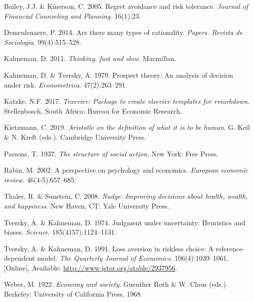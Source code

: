 \documentclass[11pt,preprint, authoryear]{elsarticle}
\numberwithin{equation}{section}
\numberwithin{figure}{section}
\numberwithin{table}{section}
\newlength{\cslhangindent}
\newenvironment{CSLReferences}%
  {\setlength{\parindent}{0pt}%
  \everypar{\setlength{\hangindent}{\cslhangindent}}\ignorespaces}%
  {\par}
\begin{document}
\hypertarget{refs}{}
\begin{CSLReferences}{1}{0}
\leavevmode\hypertarget{ref-regret}{}%
Bailey, J.J. \& Kinerson, C. 2005. Regret avoidance and risk tolerance.
\emph{Journal of Financial Counseling and Planning}. 16(1):23.

\leavevmode\hypertarget{ref-types}{}%
Demeulenaere, P. 2014. Are there many types of rationality.
\emph{Papers. Revista de Sociologia}. 99(4):515--528.

\leavevmode\hypertarget{ref-fast}{}%
Kahneman, D. 2011. \emph{Thinking, fast and slow}. Macmillan.

\leavevmode\hypertarget{ref-prospect}{}%
Kahneman, D. \& Tversky, A. 1979. Prospect theory: An analysis of
decision under risk. \emph{Econometrica}. 47(2):263--291.

\leavevmode\hypertarget{ref-Texevier}{}%
Katzke, N.F. 2017. \emph{{Texevier}: {P}ackage to create elsevier
templates for rmarkdown}. Stellenbosch, South Africa: Bureau for
Economic Research.

\leavevmode\hypertarget{ref-aristotle}{}%
Kietzmann, C. 2019. \emph{Aristotle on the definition of what it is to
be human}. G. Keil \& N. Kreft (eds.). Cambridge University Press.

\leavevmode\hypertarget{ref-parsons}{}%
Parsons, T. 1937. \emph{The structure of social action}. New York: Free
Press.

\leavevmode\hypertarget{ref-rabin}{}%
Rabin, M. 2002. A perspective on psychology and economics.
\emph{European economic review}. 46(4-5):657--685.

\leavevmode\hypertarget{ref-nudge}{}%
Thaler, R. \& Sunstein, C. 2008. \emph{Nudge: Improving decisions about
health, wealth, and happiness.} New Haven, CT: Yale University Press.

\leavevmode\hypertarget{ref-khan}{}%
Tversky, A. \& Kahneman, D. 1974. Judgment under uncertainty: Heuristics
and biases. \emph{Science}. 185(4157):1124--1131.

\leavevmode\hypertarget{ref-ref}{}%
Tversky, A. \& Kahneman, D. 1991. Loss aversion in riskless choice: A
reference-dependent model. \emph{The Quarterly Journal of Economics}.
106(4):1039--1061. {[}Online{]}, Available:
\url{http://www.jstor.org/stable/2937956}.

\leavevmode\hypertarget{ref-weber}{}%
Weber, M. 1922. \emph{Economy and society}. Guenther Roth \& W. Claus
(eds.). Berkeley: University of California Press, 1968.

\end{CSLReferences}


\end{document}

